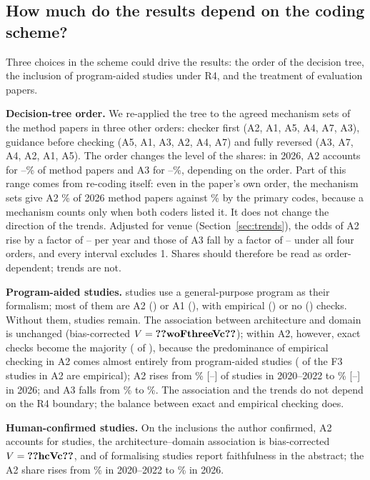 \subsection{How much do the results depend on the coding scheme?}
\label{sec:taxonomy-sens}
Three choices in the scheme could drive the results: the order of the decision tree, the inclusion of program-aided studies under R4, and the treatment of evaluation papers.

\textbf{Decision-tree order.} We re-applied the tree to the agreed mechanism sets of the method papers in three other orders: checker first (A2, A1, A5, A4, A7, A3), guidance before checking (A5, A1, A3, A2, A4, A7) and fully reversed (A3, A7, A4, A2, A1, A5). The order changes the level of the shares: in 2026, A2 accounts for --\% of method papers and A3 for --\%, depending on the order. Part of this range comes from re-coding itself: even in the paper's own order, the mechanism sets give A2 \% of 2026 method papers against \% by the primary codes, because a mechanism counts only when both coders listed it. It does not change the direction of the trends. Adjusted for venue (Section~\ref{sec:trends}), the odds of A2 rise by a factor of -- per year and those of A3 fall by a factor of -- under all four orders, and every interval excludes 1. Shares should therefore be read as order-dependent; trends are not.

\textbf{Program-aided studies.}  studies use a general-purpose program as their formalism; most of them are A2 () or A1 (), with empirical () or no () checks. Without them,  studies remain. The association between architecture and domain is unchanged (bias-corrected $V=\cnt{woFthreeVc}$); within A2, however, exact checks become the majority ( of ), because the predominance of empirical checking in A2 comes almost entirely from program-aided studies ( of the  F3 studies in A2 are empirical); A2 rises from \% [--] of studies in 2020--2022 to \% [--] in 2026; and A3 falls from \% to \%. The association and the trends do not depend on the R4 boundary; the balance between exact and empirical checking does.
\ifhumancheck

\textbf{Human-confirmed studies.} On the  inclusions the author confirmed, A2 accounts for  studies, the architecture--domain association is bias-corrected $V=\cnt{hcVc}$, and  of  formalising studies report faithfulness in the abstract; the A2 share rises from \% in 2020--2022 to \% in 2026.
\fi
